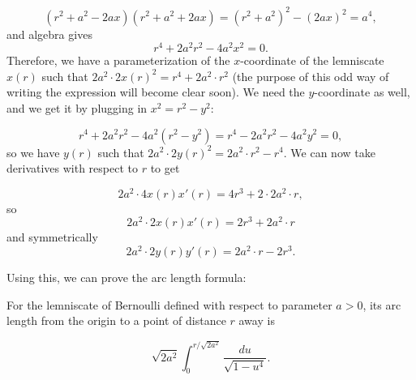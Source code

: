 \[(r^2 +a^2 - 2ax )(r^2+ a^2 + 2ax) = (r^2 + a^2)^2 - (2ax)^2   = a^4,\]
and algebra gives
\[ r^4 + 2 a^2 r^2 - 4 a^2 x^2 = 0.\]
Therefore, we have a parameterization of the $x$-coordinate of the lemniscate $x(r)$ such that $ 2 a^2 \cdot 2x(r)^2  = r^4 + 2 a^2  \cdot 
r^2$ (the purpose of this odd way of writing the expression will become clear soon). We need the $y$-coordinate as well, and we get it by plugging in $x^2 = r^2 - y^2$:

\[ r^4 + 2 a^2 r^2 - 4 a^2 (r^2 - y^2) = r^4 - 2 a^2 r^2 - 4a^2 y^2 = 0   ,\]
so we have $y(r)$ such that $ 2a^2 \cdot 2y(r)^2 =  2a^2 \cdot r^2 - r^4$. We can now take derivatives with respect to $r$ to get

\[  2a^2 \cdot 4x(r) x'(r) = 4r^3 + 2 \cdot 2a^2 \cdot r, \]
so 
\[ 2a^2 \cdot 2x(r) x'(r) = 2r^3 + 2 a^2 \cdot r\]
and symmetrically
\[ 2a^2 \cdot 2 y(r) y'(r) = 2a^2 \cdot r - 2r^3.\]

Using this, we can prove the arc length formula:

\begin{proposition}
For the lemniscate of Bernoulli defined with respect to parameter $a > 0$, its arc length from the origin to a point of distance $r$ away is 

\[ \sqrt{2a^2} \int_0^{r / \sqrt{2a^2} }  \frac{du} {\sqrt{1 -  u^4}}  . \]
\end{proposition}

